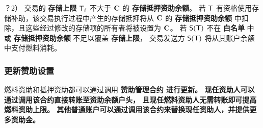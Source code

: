 ？2） 交易的 {\bf 存储上限} $\textsf{T}_\ell$ 不大于 $\mathbf{C}$ 的 {\bf 存储抵押资助余额}。
若 $\textsf{T}$ 有资格使用存储补助，该交易执行过程中产生的存储抵押将从 $\mathbf{C}$ 的 \textbf{存储抵押资助余额} 中扣除，且这些经过修改的存储项的所有者将被设置为 $\mathbf{C}$。
若 $\mathsf{S}{\left({\textsf{T}} \right)}$ 不在 \textbf{白名单} 中或 \textbf{存储抵押资助余额} 不足以覆盖 {\bf 存储上限}， 交易发送方 $\mathsf{S}{\left({\textsf{T}} \right)}$ 将从其账户余额中支付燃料消耗。


\subsubsection{更新赞助设置}

燃料资助和抵押资助都可以通过调用 \bf{赞助管理合约} 进行更新。
现任资助人可以通过调用该合约直接转账至资助余额户头，
且现任燃料资助人无需转账即可提高 \textbf{燃料资助上限}。
其他普通账户可以通过调用该合约来替换现任资助人，并提供更多资助金。



